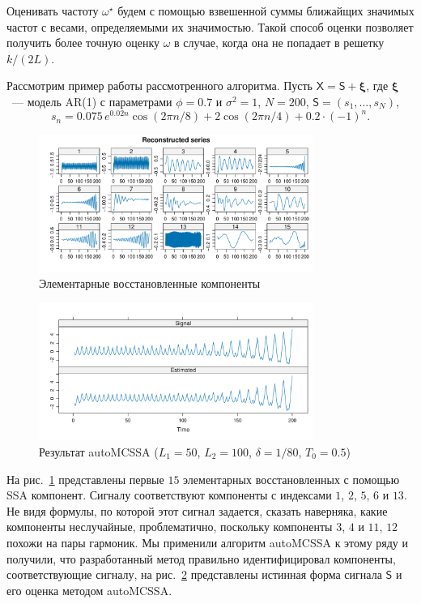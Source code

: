 \documentclass[12pt]{article}
\begin{document}
Оценивать частоту $\omega^\star$ будем с помощью взвешенной суммы ближайщих значимых частот с весами, определяемыми их значимостью. 
Такой способ оценки позволяет получить более точную оценку $\omega$ в случае, когда она не попадает в решетку $k/(2L)$.

Рассмотрим пример работы рассмотренного алгоритма. Пусть $\mathsf{X}=\mathsf{S}+\bm{\xi}$, где $\bm\xi$~--- модель AR(1) с параметрами $\phi=0.7$ и $\sigma^2=1$, $N=200$, $\mathsf{S}=(s_1,\ldots, s_N)$,
\[
s_n=0.075\, e^{0.02n}\cos(2\pi n/8) + 2\cos(2\pi n / 4) + 0.2\cdot(-1)^n.
\]


\begin{figure}[!h]
    \centering
    \includegraphics[width=0.8\textwidth]{img/reconstructed_ts.pdf}
    \caption{Элементарные восстановленные компоненты}
    \label{fig:reconstructed_ts}
\end{figure}

\begin{figure}[!h]
    \centering
    \includegraphics[width=0.8\textwidth]{img/auto_mcssa_result.pdf}
    \caption{Результат autoMCSSA ($L_1=50$, $L_2=100$, $\delta=1/80$, $T_0=0.5$)}
    \label{fig:autoMCSSA_res}
\end{figure}

На рис.~\ref{fig:reconstructed_ts} представлены первые $15$ элементарных восстановленных с помощью SSA компонент. Сигналу соответствуют компоненты с индексами $1$, $2$, $5$, $6$ и $13$. Не видя формулы, по которой этот сигнал задается, сказать наверняка, какие компоненты неслучайные, проблематично, поскольку компоненты $3$, $4$ и $11$, $12$ похожи на пары гармоник. Мы применили алгоритм autoMCSSA к этому ряду и получили, что разработанный метод правильно идентифицировал компоненты, соответствующие сигналу, на рис.~\ref{fig:autoMCSSA_res} представлены истинная форма сигнала $\mathsf{S}$ и его оценка методом autoMCSSA.
\end{document}
